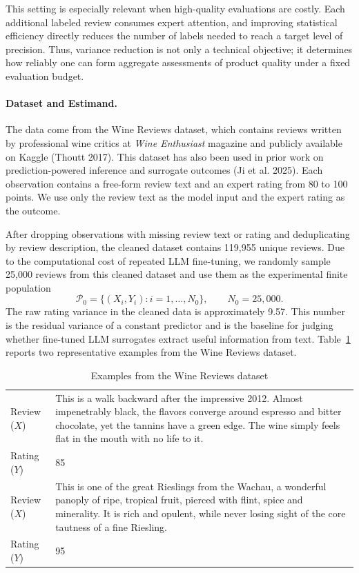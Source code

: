 \documentclass[11pt]{article}
\begin{document}
This setting is especially relevant when high-quality evaluations are costly. Each additional
labeled review consumes expert attention, and improving statistical efficiency directly reduces
the number of labels needed to reach a target level of precision. Thus, variance reduction is not
only a technical objective; it determines how reliably one can form aggregate assessments of
product quality under a fixed evaluation budget.

\paragraph{Dataset and Estimand.}
The data come from the Wine Reviews dataset, which contains reviews written by
professional wine critics at \emph{Wine Enthusiast} magazine and publicly available on Kaggle
(Thoutt 2017). This dataset has also been used in prior work on prediction-powered inference and
surrogate outcomes (Ji et al. 2025). Each observation contains a free-form review text and an
expert rating from 80 to 100 points. We use only the review text as the model input and the
expert rating as the outcome.

After dropping observations with missing review text or rating and deduplicating by review
description, the cleaned dataset contains 119,955 unique reviews. Due to the computational cost
of repeated LLM fine-tuning, we randomly sample 25,000 reviews from this cleaned dataset and use
them as the experimental finite population
\[
    \mathcal{P}_0=\{(X_i,Y_i):i=1,\ldots,N_0\},\qquad N_0=25{,}000.
\]
The raw rating variance in the cleaned data is approximately 9.57. This number is the residual
variance of a constant predictor and is the baseline for judging whether fine-tuned LLM
surrogates extract useful information from text.
Table~\ref{tab:wine_examples} reports two representative examples from the Wine Reviews dataset.

\begin{table}[H]
\centering
\caption{Examples from the Wine Reviews dataset}
\label{tab:wine_examples}
\begin{tabularx}{\textwidth}{@{}p{} X@{}}
\toprule
Review ($X$) &
This is a walk backward after the impressive 2012. Almost impenetrably black, the flavors
converge around espresso and bitter chocolate, yet the tannins have a green edge. The wine
simply feels flat in the mouth with no life to it. \\
\addlinespace
Rating ($Y$) & 85 \\
\midrule
Review ($X$) &
This is one of the great Rieslings from the Wachau, a wonderful panoply of ripe, tropical
fruit, pierced with flint, spice and minerality. It is rich and opulent, while never losing
sight of the core tautness of a fine Riesling. \\
\addlinespace
Rating ($Y$) & 95 \\
\bottomrule
\end{tabularx}
\end{table}
\end{document}
